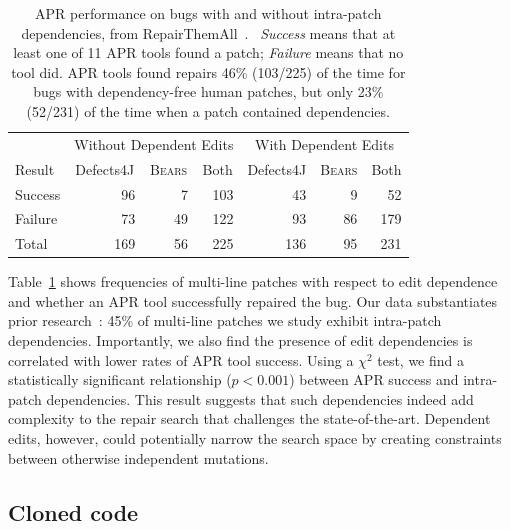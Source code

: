 \documentclass[10pt,journal,compsoc]{IEEEtran}
\newcommand\bears{\textsc{Bears}\xspace}
\begin{document}
\begin{table}
{\begin{center}
    \begin{tabular}{lrrrrrr}
        \toprule
        &\multicolumn{3}{c}{Without Dependent Edits} & \multicolumn{3}{c}{With Dependent Edits} \\
        Result& \multicolumn{1}{c}{Defects4J} & \multicolumn{1}{c}{\bears} & \multicolumn{1}{c}{Both} & \multicolumn{1}{c}{Defects4J} & \multicolumn{1}{c}{\bears} & \multicolumn{1}{c}{Both} \\
        \midrule
        Success & 96 & 7 & 103 & 43 & 9 &  52 \\
        Failure & 73 & 49 & 122 & 93 & 86 & 179\\
        \midrule
        Total  & 169 & 56 & 225 & 136 & 95 & 231\\
        \bottomrule
    \end{tabular}
 \end{center}
} \caption{\small APR performance on bugs with and without intra-patch 
      dependencies, from RepairThemAll~\cite{durieux-repair-them-all}.%
      \ \emph{Success} means that at least one of 11 APR tools found a patch; 
      \emph{Failure} means that no tool did.  APR tools found repairs 46\%
      (103/225) of the time for bugs with dependency-free human patches, but only
      23\% (52/231) of the time when a patch contained dependencies.}
  \label{tab:dependency-repair-contingency-table}
\end{table}

Table~\ref{tab:dependency-repair-contingency-table}
shows frequencies of multi-line patches with respect to edit dependence 
and whether an APR tool successfully repaired the bug.
Our data substantiates prior research~\cite{zhong2015}:
45\% of multi-line patches we study exhibit intra-patch dependencies. 
Importantly, 
we also find the presence of edit dependencies is correlated with lower rates of
APR tool success. 
Using a $\chi^2$ test, we find a statistically significant relationship ($p < 0.001$)
between APR success and intra-patch dependencies.
This result 
suggests that such dependencies indeed 
add complexity to the repair search that challenges the state-of-the-art.
Dependent edits, however, could
potentially narrow the search space by creating constraints between 
otherwise independent mutations. 


\subsection{Cloned code}
\label{sec:clones}
\end{document}
